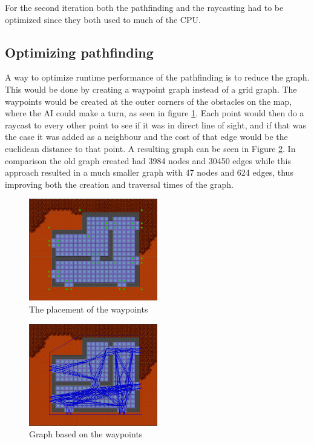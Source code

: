For the second iteration both the pathfinding and the raycasting had to be optimized since they both used to much of the CPU.

\subsection*{Optimizing pathfinding}
A way to optimize runtime performance of the pathfinding is to reduce the graph.
This would be done by creating a waypoint graph instead of a grid graph.
The waypoints would be created at the outer corners of the obstacles on the map, where the AI could make a turn, as seen in figure \ref{waypointsNode}.
Each point would then do a raycast to every other point to see if it was in direct line of sight, and if that was the case it was added as a neighbour and the cost of that edge would be the euclidean distance to that point.
A resulting graph can be seen in Figure \ref{waypointgraph}.
In comparison the old graph created had 3984 nodes and 30450 edges while this approach resulted in a much smaller graph with 47 nodes and 624 edges, thus improving both the creation and traversal times of the graph.

\begin{figure}[H]
\begin{center}
	\includegraphics[width=0.5\textwidth]{figures/astar/waypoints}
	\caption{The placement of the waypoints}
	\label{waypointsNode}
	\end{center}
\end{figure}

\begin{figure}[H]
\begin{center}
	\includegraphics[width=0.5\textwidth]{figures/astar/waypointsGraph}
	\caption{Graph based on the waypoints}
	\label{waypointgraph}\end{center}
\end{figure}

